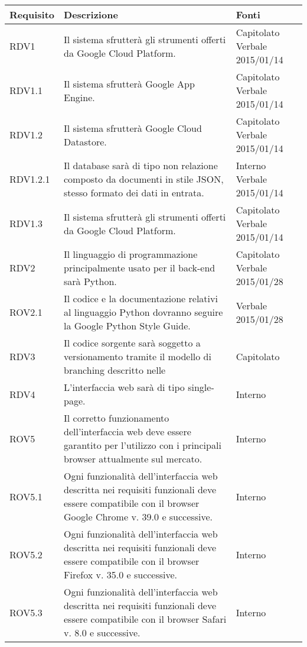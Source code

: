 \begin{center}

	\def\arraystretch{1.5}
	\bgroup
	\begin{longtable}{| p{2.5cm} | p{8cm} | p{2cm} |}

		\hline
		\textbf{Requisito} & \textbf{Descrizione} & \textbf{Fonti} \\
		\hline

		RDV1  &  Il sistema sfrutterà gli strumenti offerti da Google Cloud Platform.  &  Capitolato \newline Verbale 2015/01/14 \\
		\hline
		RDV1.1  &  Il sistema sfrutterà Google App Engine.  &  Capitolato \newline Verbale 2015/01/14 \\
		\hline
		RDV1.2  &  Il sistema sfrutterà Google Cloud Datastore.  &  Capitolato \newline Verbale 2015/01/14 \\
		\hline
		RDV1.2.1  &  Il database sarà di tipo non relazione composto da documenti in stile JSON, stesso formato dei dati in entrata.  &  Interno \newline Verbale 2015/01/14 \\
		\hline
		RDV1.3  &  Il sistema sfrutterà gli strumenti offerti da Google Cloud Platform.  &  Capitolato \newline Verbale 2015/01/14 \\
		\hline

		RDV2  &  Il linguaggio di programmazione principalmente usato per il back-end sarà Python.  &  Capitolato \newline Verbale 2015/01/28 \\
		\hline
		ROV2.1 & Il codice e la documentazione relativi al linguaggio Python dovranno seguire la Google Python Style Guide. & Verbale 2015/01/28 \\
		\hline

		RDV3  &  Il codice sorgente sarà soggetto a versionamento tramite il modello di branching descritto nelle \docNameVersionNdP  &  Capitolato \\
		\hline
		RDV4  &  L'interfaccia web sarà di tipo single-page.  &  Interno \\
		\hline

		ROV5  &  Il corretto funzionamento dell'interfaccia web deve essere garantito per l'utilizzo con i principali browser attualmente sul mercato.   &  Interno \\
		\hline
		ROV5.1  &  Ogni funzionalità dell'interfaccia web descritta nei requisiti funzionali deve essere compatibile con il browser Google Chrome v. 39.0 e successive.   &  Interno \\
		\hline
		ROV5.2  &  Ogni funzionalità dell'interfaccia web descritta nei requisiti funzionali deve essere compatibile con il browser Firefox v. 35.0 e successive.   &  Interno \\
		\hline
		ROV5.3  &  Ogni funzionalità dell'interfaccia web descritta nei requisiti funzionali deve essere compatibile con il browser Safari v. 8.0 e successive.   &  Interno \\
		\hline


\end{longtable}
\end{center}

